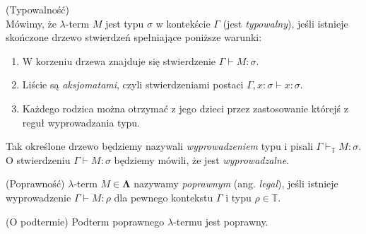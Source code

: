 \begin{definicja}(Typowalność)\\
  Mówimy, że \(\lambda\)-term \(M\) jest typu \(\sigma\) w kontekście \(\Gamma\) (jest \emph{typowalny}), jeśli istnieje skończone drzewo stwierdzeń spełniające poniższe warunki:
  \begin{enumerate}[label=(D\arabic*)]
      \setlength\itemsep{0em}
      \item W korzeniu drzewa znajduje się stwierdzenie \(\Gamma \vdash M:\sigma\).
      \item Liście są \emph{aksjomatami}, czyli stwierdzeniami postaci \(\Gamma, x:\sigma \vdash x:\sigma\).
      \item Każdego rodzica można otrzymać z jego dzieci przez zastosowanie którejś z reguł wyprowadzania typu.
  \end{enumerate}
  Tak określone drzewo będziemy nazywali \emph{wyprowadzeniem} typu i pisali \(\Gamma \vdash_\mathbb{T} M:\sigma\). O stwierdzeniu \(\Gamma \vdash M:\sigma\) będziemy mówili, że jest \emph{wyprowadzalne}.
\end{definicja}

\begin{definicja}(Poprawność)
  \(\lambda\)-term \(M\in\mathbf{\Lambda}\) nazywamy \emph{poprawnym} (ang. \emph{legal}), jeśli istnieje wyprowadzenie \(\Gamma\vdash M:\rho\) dla pewnego kontekstu \(\Gamma\) i typu \(\rho\in\mathbb{T}\). 
\end{definicja}
\begin{lemat}(O podtermie)
  Podterm poprawnego \(\lambda\)-termu jest poprawny.
\end{lemat}


